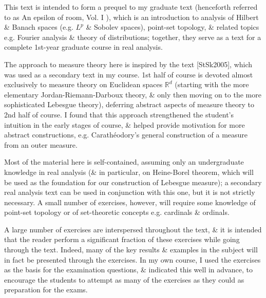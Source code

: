 \documentclass{article}
\begin{document}
\begin{enumerate}
	This text is intended to form a prequel to my graduate text \cite{Tao_epsilon_I} (henceforth referred to as An epsilon of room, Vol. I ), which is an introduction to analysis of Hilbert \& Banach spaces (e.g. $L^p$ \& Sobolev spaces), point-set topology, \& related topics e.g. Fourier analysis \& theory of distributions; together, they serve as a text for a complete 1st-year graduate course in real analysis.
	
	The approach to measure theory here is inspired by the text [StSk2005], which was used as a secondary text in my course. 1st half of course is devoted almost exclusively to measure theory on Euclidean spaces $\mathbb{R}^d$ (starting with the more elementary Jordan-Riemann-Darboux theory, \& only then moving on to the more sophisticated Lebesgue theory), deferring abstract aspects of measure theory to 2nd half of course. I found that this approach strengthened the student's intuition in the early stages of course, \& helped provide motivation for more abstract constructions, e.g. Carath\'eodory's general construction of a measure from an outer measure.
	
	Most of the material here is self-contained, assuming only an undergraduate knowledge in real analysis (\& in particular, on Heine-Borel theorem, which will be used as the foundation for our construction of Lebesgue measure); a secondary real analysis text can be used in conjunction with this one, but it is not strictly necessary. A small number of exercises, however, will require some knowledge of point-set topology or of set-theoretic concepts e.g. cardinals \& ordinals.
	
	A large number of exercises are interspersed throughout the text, \& it is intended that the reader perform a significant fraction of these exercises while going through the text. Indeed, many of the key results \& examples in the subject will in fact be presented through the exercises. In my own course, I used the exercises as the basis for the examination questions, \& indicated this well in advance, to encourage the students to attempt as many of the exercises as they could as preparation for the exams.
	

\end{enumerate}
\end{document}
